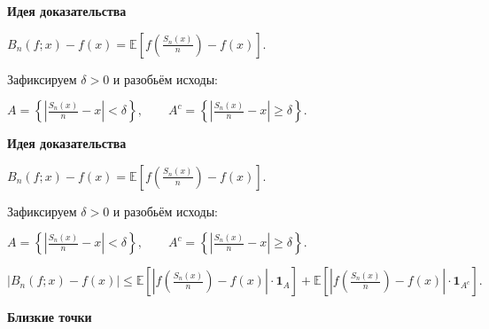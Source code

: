 \documentclass[11pt]{article}
\begin{document}
\newpage

\begin{center}
{\color{notaeYELLOW}\bfseries\fontsize{44}{52}\selectfont Идея доказательства}
\end{center}
\vspace*{\fill}
\begin{center}
\fontsize{36}{43}\selectfont
$B_n(f;x) - f(x) = \mathbb{E}\left[ f\!\left(\frac{S_n(x)}{n}\right) - f(x) \right].$\par\vspace{0.4in}
Зафиксируем $\delta>0$ и разобьём исходы:\par\vspace{0.4in}
$A = \left\{ \left|\frac{S_n(x)}{n} - x \right| < \delta \right\}, \qquad A^c = \left\{ \left|\frac{S_n(x)}{n} - x \right| \geqslant \delta \right\}.$\par\vspace{0.4in}
\end{center}
\vspace*{\fill}

\newpage

\begin{center}
{\color{notaeYELLOW}\bfseries\fontsize{44}{52}\selectfont Идея доказательства}
\end{center}
\vspace*{\fill}
\begin{center}
\fontsize{36}{43}\selectfont
$B_n(f;x) - f(x) = \mathbb{E}\left[ f\!\left(\frac{S_n(x)}{n}\right) - f(x) \right].$\par\vspace{0.4in}
Зафиксируем $\delta>0$ и разобьём исходы:\par\vspace{0.4in}
$A = \left\{ \left|\frac{S_n(x)}{n} - x \right| < \delta \right\}, \qquad A^c = \left\{ \left|\frac{S_n(x)}{n} - x \right| \geqslant \delta \right\}.$\par\vspace{0.4in}
$\left| B_n(f;x) - f(x) \right| \leqslant \mathbb{E}\left[ \left| f\!\left(\frac{S_n(x)}{n}\right) - f(x) \right| \cdot \mathbf{1}_A \right] + \mathbb{E}\left[ \left| f\!\left(\frac{S_n(x)}{n}\right) - f(x) \right| \cdot \mathbf{1}_{A^c} \right].$\par\vspace{0.4in}
\end{center}
\vspace*{\fill}

\newpage

\begin{center}
{\color{notaeYELLOW}\bfseries\fontsize{44}{52}\selectfont Близкие точки}
\end{center}
\vspace*{\fill}
\begin{center}
\fontsize{36}{43}\selectfont
\end{center}
\vspace*{\fill}
\end{document}
